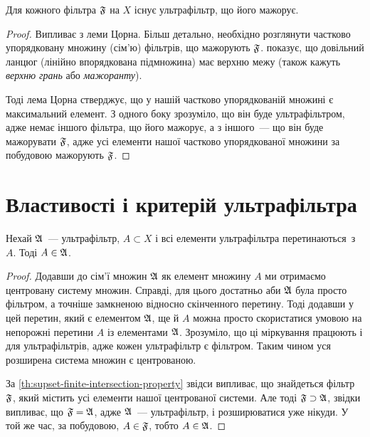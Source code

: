 \begin{theorem}
    \label{th:every-filter-has-supset-ultrafilter}
    Для кожного фільтра $\frak F$ на $X$ існує ультрафільтр, що його мажорує.
\end{theorem}
\begin{proof}
    Випливає з леми Цорна. Більш детально, необхідно розглянути частково упорядковану множину (сім'ю) фільтрів, що мажорують $\frak F$.  показує, що довільний ланцюг (лінійно впорядкована підмножина) має верхню межу (також кажуть \emph{верхню грань} або \emph{мажоранту}). 
    
    Тоді лема Цорна стверджує, що у нашій частково упорядкованій множині є максимальний елемент. З одного боку зрозуміло, що він буде ультрафільтром, адже немає іншого фільтра, що його мажорує, а з іншого~--- що він буде мажорувати $\frak F$, адже усі елементи нашої частково упорядкованої множини за побудовою мажорують $\frak F$.
\end{proof}

\section{Властивості і критерій ультрафільтра}

\begin{lemma}
    \label{lem:ultrafilter-absorbs-intersections}
    Нехай $\frak A$~--- ультрафільтр, $A \subset X$ і всі елементи ультрафільтра перетинаються~з~$A$. Тоді $A \in \frak A$.
\end{lemma}
\begin{proof}
    Додавши до сім'ї множин $\frak A$ як елемент множину $A$ ми отримаємо центровану систему множин. Справді, для цього достатньо аби $\frak A$ була просто фільтром, а точніше замкненою відносно скінченного перетину. Тоді додавши у цей перетин, який є елементом $\frak A$, ще й $A$ можна просто скористатися умовою на непорожні перетини $A$ із елементами $\frak A$. Зрозуміло, що ці міркування працюють і для ультрафільтрів, адже кожен ультрафільтр є фільтром. Таким чином уся розширена система множин є центрованою. 
    
    За \cref{th:supset-finite-intersection-property} звідси випливає, що знайдеться фільтр $\frak F$, який містить усі елементи нашої центрованої системи. Але тоді $\frak F \supset \frak A$, звідки випливає, що $\frak F = \frak A$, адже $\frak A$~--- ультрафільтр, і розширюватися уже нікуди. У той же час, за побудовою, $A \in \frak F$, тобто $A \in \frak A$.
\end{proof}


